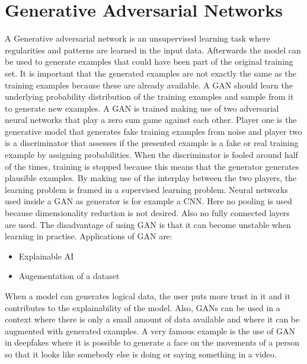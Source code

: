 \documentclass[a4paper,10pt]{article}
\begin{document}
\section{Generative Adversarial Networks}
A Generative adversarial network is an unsupervised learning task where regularities and patterns are learned in the input data. Afterwards the model can be used to generate examples that could have been part of the original training set. It is important that the generated examples are not exactly the same as the training examples because these are already available. A GAN should learn the underlying probability distribution of the training examples and sample from it to generate new examples. A GAN is trained making use of two adversarial neural networks that play a zero sum game against each other. Player one is the generative model that generates fake training examples from noise and player two is a discriminator that assesses if the presented example is a fake or real training example by assigning probabilities. When the discriminator is fooled around half of the times, training is stopped because this means that the generator generates plausible examples. By making use of the interplay between the two players, the learning problem is framed in a supervised learning problem. Neural networks used inside a GAN as generator is for example a CNN. Here no pooling is used because dimensionality reduction is not desired. Also no fully connected layers are used. The disadvantage of using GAN is that it can become unstable when learning in practise. Applications of GAN are:
\begin{itemize}
	\item Explainable AI
	\item Augementation of a dataset
\end{itemize}

When a model can generates logical data, the user puts more trust in it and it contributes to the explainability of the model. Also, GANs can be used in a context where there is only a small amount of data available and where it can be augmented with generated examples. A very famous example is the use of GAN in deepfakes where it is possible to generate a face on the movements of a person so that it looks like somebody else is doing or saying something in a video. \\
\end{document}
